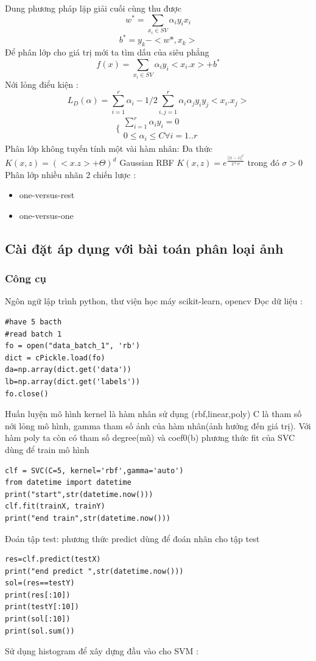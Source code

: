 \documentclass[a4paper,12pt]{report}
\begin{document}
Dung phương pháp lặp giải cuối cùng thu được
$$w^* =\sum_{x_i \in SV} \alpha_i y_i x_i  $$
$$b^*=y_k-<w*,x_k>$$
Để phân lớp cho giá trị mới ta tìm dấu của siêu phẳng $$ f(x)=\sum_{x_i \in SV} \alpha_i y_i <x_i .x>+b^*$$
Nới lỏng điểu kiện :
$$L_D(\alpha)=\sum_{i=1}^r \alpha_i-1/2 \sum_{i,j=1}^{r}\alpha_i \alpha_j y_i y_j<x_i.x_j> $$
$$
\{ \begin{array}{l}
\sum_{i=1 } ^{r} \alpha_i y_i =0 \\
0 \leq \alpha_i \leq C \forall i=1..r
\end{array}
$$
Phân lớp không tuyến tính một vài hàm nhân:
Đa thức $K(x,z)=(<x.z>+\Theta)^d $
Gaussian RBF $K(x,z)=e^{\frac{||x-z||^2}{2*\sigma}}$ trong đó $\sigma >0$
Phân lớp nhiều nhãn 2 chiến lược :
\begin{itemize}
\item one-versus-rest
\item one-versus-one 
\end{itemize}
\subsection{Cài đặt áp dụng với bài toán phân loại ảnh}
\subsubsection{Công cụ}
Ngôn ngữ lập trình python, thư viện học máy scikit-learn, opencv
Đọc dữ liệu :
\begin{lstlisting}
#have 5 bacth 
#read batch 1
fo = open("data_batch_1", 'rb')
dict = cPickle.load(fo)
da=np.array(dict.get('data'))
lb=np.array(dict.get('labels'))
fo.close()
\end{lstlisting}
Huấn luyện mô hình kernel là hàm nhân sử dụng (rbf,linear,poly) C là tham số nới lỏng mô hình, gamma tham số ảnh của hàm nhân(ảnh hưởng đến giá trị).
Với hàm poly ta còn có tham số degree(mũ) và coef0(b) phương thức fit của SVC dùng để train mô hình 
\begin{lstlisting}
clf = SVC(C=5, kernel='rbf',gamma='auto')
from datetime import datetime
print("start",str(datetime.now()))
clf.fit(trainX, trainY)
print("end train",str(datetime.now()))
\end{lstlisting}
Đoán tập test: phương thức predict dùng để đoán nhãn cho tập test 
\begin{lstlisting}
res=clf.predict(testX)
print("end predict ",str(datetime.now()))
sol=(res==testY)
print(res[:10])
print(testY[:10])
print(sol[:10])
print(sol.sum())

\end{lstlisting}
Sử dụng histogram để xây dựng đầu vào cho SVM : 
\end{document}
